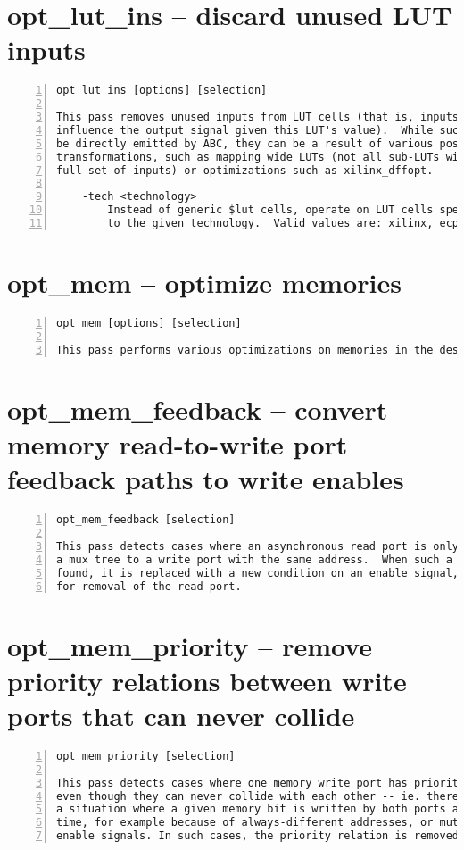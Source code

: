 \section{opt\_lut\_ins -- discard unused LUT inputs}
\label{cmd:opt_lut_ins}
\begin{lstlisting}[numbers=left,frame=single]
    opt_lut_ins [options] [selection]

This pass removes unused inputs from LUT cells (that is, inputs that can not
influence the output signal given this LUT's value).  While such LUTs cannot
be directly emitted by ABC, they can be a result of various post-ABC
transformations, such as mapping wide LUTs (not all sub-LUTs will use the
full set of inputs) or optimizations such as xilinx_dffopt.

    -tech <technology>
        Instead of generic $lut cells, operate on LUT cells specific
        to the given technology.  Valid values are: xilinx, ecp5, gowin.
\end{lstlisting}

\section{opt\_mem -- optimize memories}
\label{cmd:opt_mem}
\begin{lstlisting}[numbers=left,frame=single]
    opt_mem [options] [selection]

This pass performs various optimizations on memories in the design.
\end{lstlisting}

\section{opt\_mem\_feedback -- convert memory read-to-write port feedback paths to write enables}
\label{cmd:opt_mem_feedback}
\begin{lstlisting}[numbers=left,frame=single]
    opt_mem_feedback [selection]

This pass detects cases where an asynchronous read port is only connected via
a mux tree to a write port with the same address.  When such a connection is
found, it is replaced with a new condition on an enable signal, allowing
for removal of the read port.
\end{lstlisting}

\section{opt\_mem\_priority -- remove priority relations between write ports that can never collide}
\label{cmd:opt_mem_priority}
\begin{lstlisting}[numbers=left,frame=single]
    opt_mem_priority [selection]

This pass detects cases where one memory write port has priority over another
even though they can never collide with each other -- ie. there can never be
a situation where a given memory bit is written by both ports at the same
time, for example because of always-different addresses, or mutually exclusive
enable signals. In such cases, the priority relation is removed.
\end{lstlisting}

